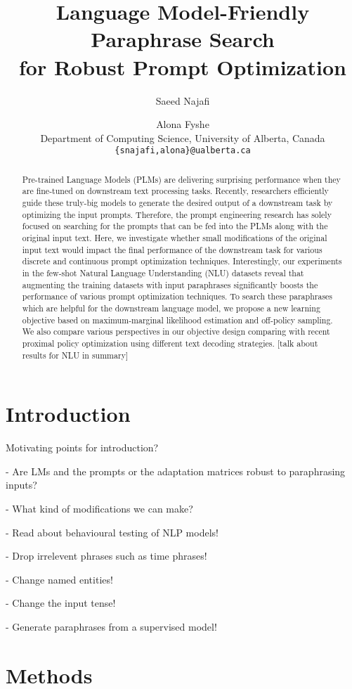 \documentclass[11pt]{article}
\title{Language Model-Friendly Paraphrase Search \\ for Robust Prompt Optimization}
\author{Saeed Najafi \and
  Alona Fyshe \\
  Department of Computing Science, University of Alberta, Canada\\
  \texttt{\{snajafi,alona\}@ualberta.ca} \\}
\begin{document}
\maketitle
\begin{abstract}
Pre-trained Language Models (PLMs) are delivering surprising performance when they are fine-tuned on downstream text processing tasks. Recently, researchers efficiently guide these truly-big models to generate the desired output of a downstream task by optimizing the input prompts. Therefore, the prompt engineering research has solely focused on searching for the prompts that can be fed into the PLMs along with the original input text. Here, we investigate whether small modifications of the original input text would impact the final performance of the downstream task for various discrete and continuous prompt optimization techniques. Interestingly, our experiments in the few-shot Natural Language Understanding (NLU) datasets reveal that augmenting the training datasets with input paraphrases significantly boosts the performance of various prompt optimization techniques. To search these paraphrases which are helpful for the downstream language model, we propose a new learning objective based on maximum-marginal likelihood estimation and off-policy sampling. We also compare various perspectives in our objective design comparing with recent proximal policy optimization using different text decoding strategies. [talk about results for NLU in summary]
\end{abstract}


\section{Introduction}
Motivating points for introduction?

- Are LMs and the prompts or the adaptation matrices robust to paraphrasing inputs?

- What kind of modifications we can make?

- Read about behavioural testing of NLP models!

- Drop irrelevent phrases such as time phrases!

- Change named entities!

- Change the input tense!

- Generate paraphrases from a supervised model!

\section{Methods}
\end{document}
